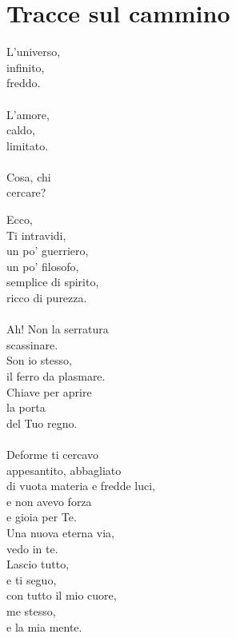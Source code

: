 \chapter{Tracce sul cammino}


\begin{haiku}
L'universo,\\
infinito,\\
freddo.\\
\leavevmode\\
L'amore,\\
caldo,\\
limitato.\\
\leavevmode\\
Cosa, chi\\
cercare?\\
\end{haiku}

\begin{haiku}
    Ecco,\\
    Ti intravidi,\\
    un po' guerriero,\\
    un po' filosofo,\\
    semplice di spirito,\\
    ricco di purezza.\\
    \leavevmode\\
    Ah! Non la serratura\\
    scassinare.\\
    Son io stesso,\\
    il ferro da plasmare.\\
    Chiave per aprire\\
    la porta\\
    del Tuo regno.\\
    \leavevmode\\
    Deforme ti cercavo\\
    appesantito, abbagliato\\
    di vuota materia e fredde luci,\\
    e non avevo forza\\
    e gioia per Te.\\
    \leavevmode
    Una nuova eterna via,\\
    vedo in te.\\
    Lascio tutto,\\
    e ti seguo,\\
    con tutto il mio cuore,\\
    me stesso,\\
    e la mia mente.\\
\end{haiku}

